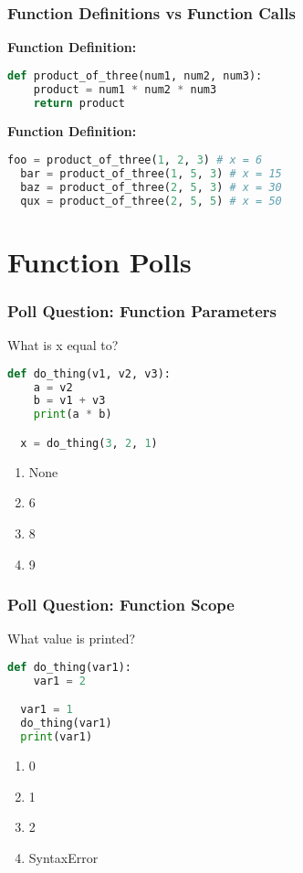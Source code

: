 \documentclass{beamer}
\begin{document}
%
%
\begin{frame}[fragile]
  \frametitle{Function Definitions vs Function Calls}
  \textbf{Function Definition:}
  \begin{lstlisting}[language=Python, autogobble]
  def product_of_three(num1, num2, num3):
    product = num1 * num2 * num3
    return product
  \end{lstlisting}
  \pause
  \vfill
  \textbf{Function Definition:}
  \begin{lstlisting}[language=Python, autogobble]
  foo = product_of_three(1, 2, 3) # x = 6
  bar = product_of_three(1, 5, 3) # x = 15
  baz = product_of_three(2, 5, 3) # x = 30
  qux = product_of_three(2, 5, 5) # x = 50
  \end{lstlisting}
\end{frame}

\section{Function Polls}
%
%
\begin{frame}[fragile]
  \frametitle{Poll Question: Function Parameters}
  What is x equal to?
  \begin{lstlisting}[language=Python, autogobble]
  def do_thing(v1, v2, v3):
    a = v2
    b = v1 + v3
    print(a * b)

  x = do_thing(3, 2, 1)
  \end{lstlisting}
  \vfill
  \begin{enumerate}[A]
    \item None
    \item 6
    \item 8 
    \item 9
  \end{enumerate}
\end{frame}

%
%
\begin{frame}[fragile]
  \frametitle{Poll Question: Function Scope}
  What value is printed?
  \begin{lstlisting}[language=Python, autogobble]
  def do_thing(var1):
    var1 = 2

  var1 = 1
  do_thing(var1)
  print(var1)
  \end{lstlisting}
  \vfill
  \begin{enumerate}[A]
    \item 0
    \item 1 
    \item 2
    \item SyntaxError
  \end{enumerate}
\end{frame}
\end{document}
